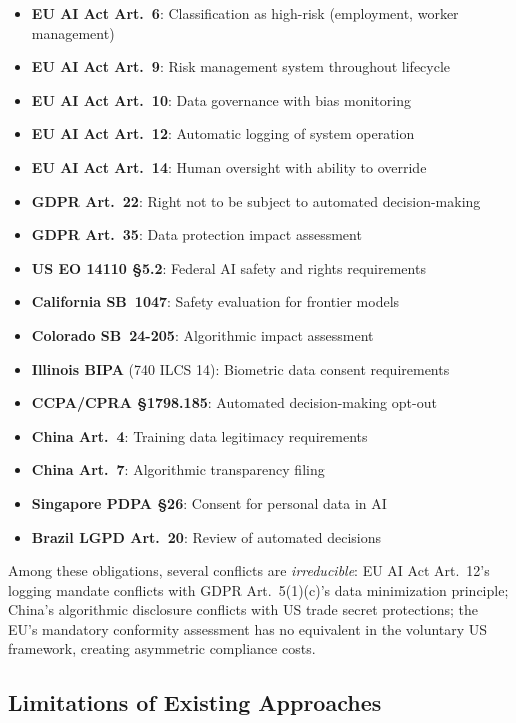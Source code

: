 \documentclass[11pt,twocolumn]{article}
\begin{document}
\begin{itemize}[nosep,leftmargin=*]
  \item \textbf{EU AI Act Art.~6}: Classification as high-risk (employment, worker management)
  \item \textbf{EU AI Act Art.~9}: Risk management system throughout lifecycle
  \item \textbf{EU AI Act Art.~10}: Data governance with bias monitoring
  \item \textbf{EU AI Act Art.~12}: Automatic logging of system operation
  \item \textbf{EU AI Act Art.~14}: Human oversight with ability to override
  \item \textbf{GDPR Art.~22}: Right not to be subject to automated decision-making
  \item \textbf{GDPR Art.~35}: Data protection impact assessment
  \item \textbf{US EO 14110 \S5.2}: Federal AI safety and rights requirements~\cite{useo14110}
  \item \textbf{California SB~1047}: Safety evaluation for frontier models
  \item \textbf{Colorado SB~24-205}: Algorithmic impact assessment
  \item \textbf{Illinois BIPA} (740 ILCS 14): Biometric data consent requirements
  \item \textbf{CCPA/CPRA \S1798.185}: Automated decision-making opt-out~\cite{ccpa2018}
  \item \textbf{China Art.~4}: Training data legitimacy requirements
  \item \textbf{China Art.~7}: Algorithmic transparency filing
  \item \textbf{Singapore PDPA \S26}: Consent for personal data in AI~\cite{singaporepdpa}
  \item \textbf{Brazil LGPD Art.~20}: Review of automated decisions~\cite{brazillgpd}
\end{itemize}

Among these obligations, several conflicts are \emph{irreducible}:
EU AI Act Art.~12's logging mandate conflicts with GDPR Art.~5(1)(c)'s data
minimization principle; China's algorithmic disclosure conflicts with US trade
secret protections; the EU's mandatory conformity assessment has no equivalent in
the voluntary US framework, creating asymmetric compliance costs.

\subsection{Limitations of Existing Approaches}
\end{document}
